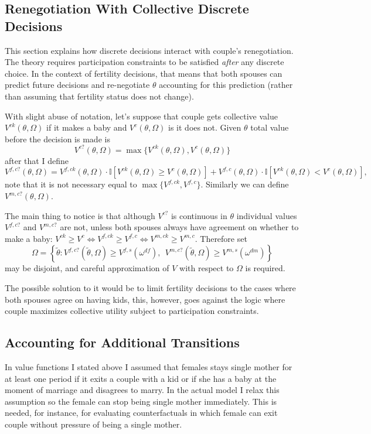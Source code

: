 \documentclass[12pt,letter]{article}
\newcommand{\I}{\mathbb{I}}
\begin{document}
\subsection{Renegotiation With Collective Discrete Decisions\label{ren-disc}}
This section explains how discrete decisions interact with couple's renegotiation. The theory requires participation constraints to be satisfied \textit{after} any discrete choice. In the context of fertility decisions, that means that both spouses can predict future decisions and re-negotiate $\theta$ accounting for this prediction (rather than assuming that fertility status does not change).

With slight abuse of notation, let's suppose that couple gets collective value $V^{ck}(\theta,\Omega)$ if it makes a baby and $V^{c}(\theta,\Omega)$ is it does not. Given $\theta$ total value before the decision is made is \[V^{c?}(\theta,\Omega) = \max\{ V^{ck}(\theta,\Omega), V^{c}(\theta,\Omega)\}\]
after that I define
\[V^{f,c?}(\theta,\Omega) = V^{f,ck}(\theta,\Omega)\cdot \I[V^{ck}(\theta,\Omega) \geq V^{c}(\theta,\Omega)] + V^{f,c}(\theta,\Omega) \cdot \I[V^{ck}(\theta,\Omega) < V^{c}(\theta,\Omega)],\]
note that it is not necessary equal to $\max\{ V^{f,ck},V^{f,c} \}$. Similarly we can define $V^{m,c?}(\theta,\Omega)$.

The main thing to notice is that although $V^{c?}$ is continuous in $\theta$ individual values $V^{f,c?}$ and $V^{m,c?}$ are not, unless both spouses always have agreement on whether to make a baby: $V^{ck} \geq V^{c} \Leftrightarrow V^{f,ck} \geq V^{f,c} \Leftrightarrow V^{m,ck} \geq V^{m,c}$. Therefore set
\[\Omega = \left\{\tilde{\theta} : V^{f,c?}(\tilde\theta,\Omega) \geq V^{f,s}(\omega^{df}), \ \  V^{m,c?}(\tilde\theta,\Omega) \geq V^{m,s}(\omega^{dm}) \right\}\]
may be disjoint, and careful approximation of $V$ with respect to $\Omega$ is required. 

The possible solution to it would be to limit fertility decisions to the cases where both spouses agree on having kids, this, however, goes against the logic where couple maximizes collective utility subject to participation constraints. 

\subsection{Accounting for Additional Transitions\label{add-trans}}
In value functions I stated above I assumed that females stays single mother for at least one period if it exits a couple with a kid or if she has a baby at the moment of marriage and disagrees to marry. In the actual model I relax this assumption so the female can stop being single mother immediately. This is needed, for instance, for evaluating counterfactuals in which female can exit couple without pressure of being a single mother. 
\end{document}
